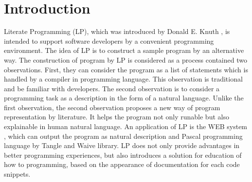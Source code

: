 \section{Introduction}
Literate Programming (LP), which was introduced by Donald E. Knuth \cite{001}, is intended to support software developers by a convenient programming environment. The idea of LP is to construct a sample program by an alternative way. The construction of program by LP is considered as a process contained two observations. First, they can consider the program as a list of statements which is handled by a compiler in programming language. This observation is traditional and be familiar with developers. The second observation is to consider a programming task as a description in the form of a natural language. Unlike the first observation, the second observation proposes a new way of program representation by literature. It helps the program not only runable but also explainable in human natural language. An application of LP is the WEB system \cite{001}, which can output the program as natural description and Pascal programming language by Tangle and Waive library. LP does not only provide advantages in better programming experiences, but also introduces a solution for education of how to programming, based on the appearance of documentation for each code snippets.
\\
